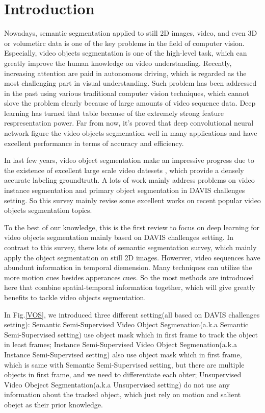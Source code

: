 \section{Introduction}
Nowadays, semantic segmentation applied to still 2D images, video, and even 3D or volumetirc data is one of the key problems in the field of computer vision.
Especially, video objects segmentation is one of the high-level task, which can greatly improve the human knowledge on video understanding.
Recently, increasing attention are paid in autonomous driving\cite{geiger2012we, cordts2016cityscapes, ess2009segmentation}, 
which is regarded as the most challenging part in visual understanding. 
Such problem has been addressed in the past using various traditional computer vision techniques, which cannot slove the problem clearly because of large amounts of video sequence data.
Deep learning has turned that table because of the extremely strong feature respresentation power. 
Far from now, it's proved that deep convolutional neural network \cite{farabet2013learning, ning2005toward} figure the video objects segmenation well in many applications and have excellent
performance in terms of accuracy and efficiency. 

In last few years, video object segmentation make an impressive progress due to the existence of excellent large scale video datesets \cite{DAVIS2016, SegTrack, Youtube}, which provide a densely
accurate labeling groundtruth. A lots of work mainly address problems on video instance segmentation and primary object segmentation in DAVIS challenges setting. So this survey mainly revise some 
excellent works on recent popular video objects segmentation topics.

To the best of our knowledge, this is the first review to focus on deep learning for video objects segmentation mainly based on DAVIS challenges setting. In contrast to this survey, there lots of 
semantic segmentation survey, which mainly apply the object segmentation on still 2D images. Howerver, video sequences have abundunt information in temporal diemension. Many techniques can utilize
the more motion cues besides apperances cues. So the most methods are introduced here that combine spatial-temporal information together, which will give greatly benefits to tackle video objects 
segmentation. 

In Fig.\ref{VOS}, we introduced three different setting(all based on DAVIS challenges setting): Semantic Semi-Supervised Video Object Segmenation(a.k.a Semantic Semi-Supervised setting) use object mask which in first frame to track the object in least frames; Instance Semi-Supervised Video Object Segmenation(a.k.a Instance Semi-Supervised setting) also use 
object mask which in first frame, which is same with Semantic Semi-Supervised setting, but there are multiple objects in first frame, and we need to differentiate each ohter; Unsupervised Video Obeject Segmentation(a.k.a Unsupervised setting) do not use any information about the tracked object, which just rely on motion and salient obejct as their prior knowledge.

